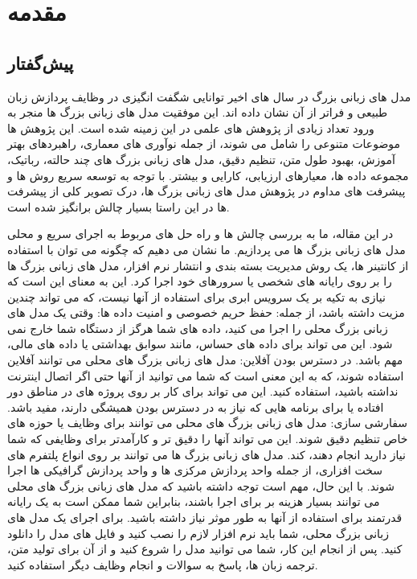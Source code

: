 \chapter{مقدمه}
\section{پیش‌گفتار}

مدل های زبانی بزرگ  در سال های اخیر توانایی شگفت انگیزی در وظایف پردازش زبان طبیعی و فراتر از آن نشان داده اند. این موفقیت مدل های زبانی بزرگ  ها منجر به ورود تعداد زیادی از پژوهش های علمی در این زمینه شده است. این پژوهش ها موضوعات متنوعی را شامل می شوند، از جمله نوآوری های معماری، راهبردهای بهتر آموزش، بهبود طول متن، تنظیم دقیق، مدل های زبانی بزرگ  های چند حالته، رباتیک، مجموعه داده ها، معیارهای ارزیابی، کارایی و بیشتر. با توجه به توسعه سریع روش ها و پیشرفت های مداوم در پژوهش مدل های زبانی بزرگ  ها، درک تصویر کلی از پیشرفت ها در این راستا بسیار چالش برانگیز شده است.

در این مقاله، ما به بررسی چالش ها و راه حل های مربوط به اجرای سریع و محلی مدل های زبانی بزرگ  ها می پردازیم. ما نشان می دهیم که چگونه می توان با استفاده از کانتینر ها، یک روش مدیریت بسته بندی و انتشار نرم افزار، مدل های زبانی بزرگ  ها را بر روی رایانه های شخصی یا سرورهای خود اجرا کرد. این به معنای این است که نیازی به تکیه بر یک سرویس ابری برای استفاده از آنها نیست، که می تواند چندین مزیت داشته باشد، از جمله: حفظ حریم خصوصی و امنیت داده ها: وقتی یک مدل های زبانی بزرگ  محلی را اجرا می کنید، داده های شما هرگز از دستگاه شما خارج نمی شود. این می تواند برای داده های حساس، مانند سوابق بهداشتی یا داده های مالی، مهم باشد. در دسترس بودن آفلاین: مدل های زبانی بزرگ  های محلی می توانند آفلاین استفاده شوند، که به این معنی است که شما می توانید از آنها حتی اگر اتصال اینترنت نداشته باشید، استفاده کنید. این می تواند برای کار بر روی پروژه های در مناطق دور افتاده یا برای برنامه هایی که نیاز به در دسترس بودن همیشگی دارند، مفید باشد. سفارشی سازی: مدل های زبانی بزرگ  های محلی می توانند برای وظایف یا حوزه های خاص تنظیم دقیق شوند. این می تواند آنها را دقیق تر و کارآمدتر برای وظایفی که شما نیاز دارید انجام دهند، کند. مدل های زبانی بزرگ  ها می توانند بر روی انواع پلتفرم های سخت افزاری، از جمله واحد پردازش مرکزی  ها و واحد پردازش گرافیکی  ها اجرا شوند. با این حال، مهم است توجه داشته باشید که مدل های زبانی بزرگ  های محلی می توانند بسیار هزینه بر برای اجرا باشند، بنابراین شما ممکن است به یک رایانه قدرتمند برای استفاده از آنها به طور موثر نیاز داشته باشید. برای اجرای یک مدل های زبانی بزرگ  محلی، شما باید نرم افزار لازم را نصب کنید و فایل های مدل را دانلود کنید. پس از انجام این کار، شما می توانید مدل را شروع کنید و از آن برای تولید متن، ترجمه زبان ها، پاسخ به سوالات و انجام وظایف دیگر استفاده کنید. 
